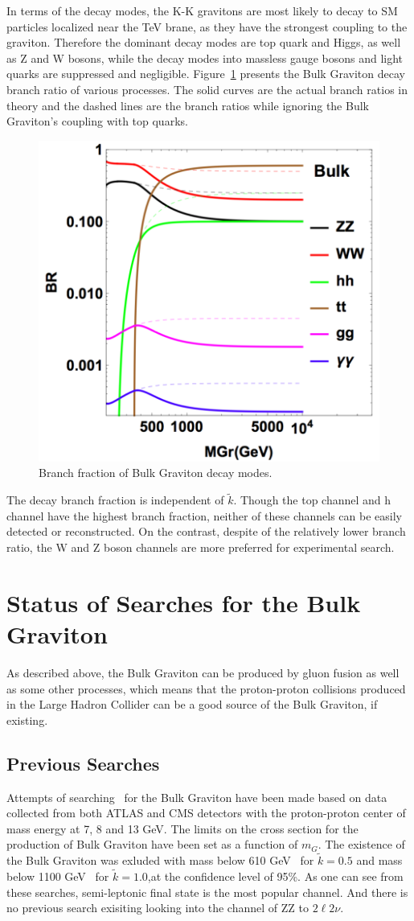 In terms of the decay modes, the K-K gravitons are most likely to decay to SM particles localized near the TeV brane, as they have the strongest coupling to the graviton. Therefore the dominant decay modes are top quark and Higgs, as well as Z and W bosons, while the decay modes into massless gauge bosons and light quarks are suppressed and negligible. Figure~\ref{fig:intro_Gbr} presents the Bulk Graviton decay branch ratio of various processes. The solid curves are the actual branch ratios in theory and the dashed lines are the branch ratios while ignoring the Bulk Graviton's coupling with top quarks.
\begin{figure}[htbp]
\begin{center}
\includegraphics[width=0.5\linewidth]{figures/intro_Gbr.png}
\caption{Branch fraction of Bulk Graviton decay modes.}
\label{fig:intro_Gbr}
\end{center}
\end{figure}
The decay branch fraction is independent of $\tilde{k}$. Though the top channel and h channel have the highest branch fraction, neither of these channels can be easily detected or reconstructed. On the contrast, despite of the relatively lower branch ratio, the W and Z boson channels are more preferred for experimental search.

\section{Status of Searches for the Bulk Graviton} 
As described above, the Bulk Graviton can be produced by gluon fusion as well as some other processes, which means that the proton-proton collisions produced in the Large Hadron Collider can be a good source of the Bulk Graviton, if existing. 
\subsection{Previous Searches}
Attempts of searching~\cite{Aad:2012nev,Aad:2013wxa,Aad:2014xka,Chatrchyan:2012baa,Khachatryan:2014gha,Aaboud:2016okv} for the Bulk Graviton have been made based on data collected from both ATLAS and CMS detectors with the proton-proton center of mass energy at 7, 8 and 13 GeV. The limits on the cross section for the production of Bulk Graviton have been set as a function of $m_{G}$. The existence of the Bulk Graviton was exluded with mass below 610 GeV~\cite{Chatrchyan:2012baa} for $\tilde{k}=0.5$ and mass below 1100 GeV~\cite{Aaboud:2016okv} for $\tilde{k}=1.0$,at the confidence level of 95\%. As one can see from these searches, semi-leptonic final state is the most popular channel. And there is no previous search exisiting looking into the channel of ZZ to $2\ell 2\nu$.
